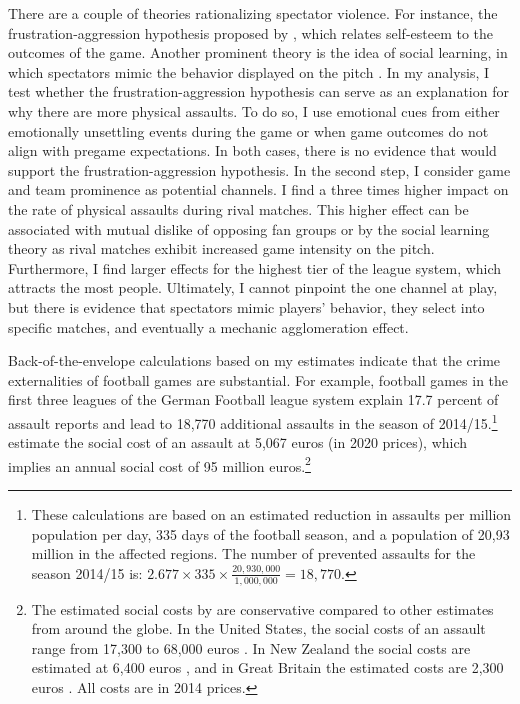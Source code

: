 There are a couple of theories rationalizing spectator violence. For instance, the frustration-aggression hypothesis proposed by \cite{dollard1939frustration}, which relates self-esteem to the outcomes of the game. Another prominent theory is the idea of social learning, in which spectators mimic the behavior displayed on the pitch \citep{bandura1973aggression, bandura2007social}. In my analysis, I test whether the frustration-aggression hypothesis can serve as an explanation for why there are more physical assaults. To do so, I use emotional cues from either emotionally unsettling events during the game or when game outcomes do not align with pregame expectations. In both cases, there is no evidence that would support the frustration-aggression hypothesis. In the second step, I consider game and team prominence as potential channels. I find a three times higher impact on the rate of physical assaults during rival matches. This higher effect can be associated with mutual dislike of opposing fan groups or by the social learning theory as rival matches exhibit increased game intensity on the pitch. Furthermore, I find larger effects for the highest tier of the league system, which attracts the most people. Ultimately, I cannot pinpoint the one channel at play, but there is evidence that spectators mimic players' behavior, they select into specific matches, and eventually a mechanic agglomeration effect. 



Back-of-the-envelope calculations based on my estimates indicate that the crime externalities of football games are substantial. For example, football games in the first three leagues of the German Football league system explain 17.7 percent of assault reports and lead to 18,770 additional assaults in the season of 2014/15.\footnote{These calculations are based on an estimated reduction in assaults per million population per day, 335 days of the football season, and a population of 20,93 million in the affected regions. The number of prevented assaults for the season 2014/15 is: $2.677 \times 335 \times \frac{20,930,000}{1,000,000} = 18,770.$} \cite{glaubitz2016kostet} estimate the social cost of an assault at 5,067 euros (in 2020 prices), which implies an annual social cost of 95 million euros.\footnote{The estimated social costs by \cite{glaubitz2016kostet} are conservative compared to other estimates from around the globe. In the United States, the social costs of an assault range from 17,300 to 68,000 euros \citep{miller1996victim,cohen2004willingness}. In New Zealand the social costs are estimated at 6,400 euros \citep{roper2006estimating}, and in Great Britain the estimated costs are 2,300 euros \citep{dubourg2005economic}. All costs are in 2014 prices.}




